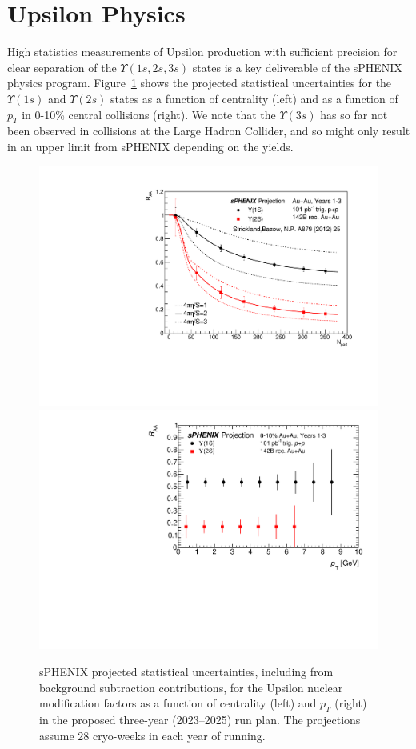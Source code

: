 \section{Upsilon Physics}
\label{sec:upsilon}

High statistics measurements of Upsilon production with sufficient
precision for clear separation of the $\Upsilon(1s,2s,3s)$ states is a
key deliverable of the sPHENIX physics program.
Figure~\ref{fig:upsilon3years} shows the projected statistical
uncertainties for the $\Upsilon(1s)$ and $\Upsilon(2s)$ states as a
function of centrality (left) and as a function of $p_{T}$ in 0-10\% central \auau collisions (right).  We note that
the $\Upsilon(3s)$ has so far not been observed in \pbpb collisions at
the Large Hadron Collider, and so might only result in an upper limit
from sPHENIX depending on the yields.


\begin{figure}[h]
    \centering
    \includegraphics[width=0.44\linewidth]{figs/upsilon_centrality_yrs1_3_28wks.pdf}
    \includegraphics[width=0.47\linewidth]{figs/upsilon_RAA_1.pdf}
    \caption{sPHENIX projected statistical uncertainties, including
      from background subtraction contributions, for the Upsilon
      nuclear modification factors as a function of centrality (left) and $p_T$ (right) in the proposed three-year
      (2023--2025) run plan.   The projections assume 28
      cryo-weeks in each year of running. 
      \label{fig:upsilon3years}}
\end{figure}

